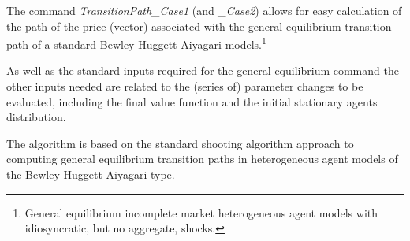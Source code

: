  
The command \textit{TransitionPath\_{}Case1} (and \textit{\_{}Case2}) allows for easy calculation of the path of the price (vector) associated with the general equilibrium transition path of
a standard Bewley-Huggett-Aiyagari models.\footnote{General equilibrium incomplete market heterogeneous agent models with idiosyncratic, but no aggregate, shocks.}

As well as the standard inputs required for the general equilibrium command the other inputs needed are related to the (series of) parameter changes to be evaluated, including the final value function
and the initial stationary agents distribution.

The algorithm is based on the standard shooting algorithm approach to computing general equilibrium transition paths in heterogeneous agent models of the Bewley-Huggett-Aiyagari type.

%

